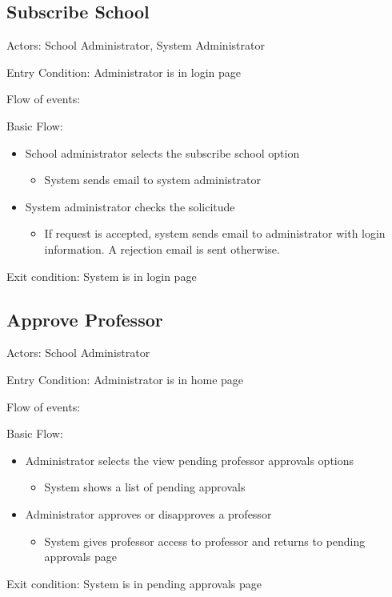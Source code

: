 
\subsection*{Subscribe School}
Actors: School Administrator, System Administrator

Entry Condition: Administrator is in login page

Flow of events:

Basic Flow:

\begin{itemize}
\item School administrator selects the subscribe school option
\begin{itemize}
\item System sends email to system administrator
\end{itemize}
\item System administrator checks the solicitude
\begin{itemize}
\item If request is accepted, system sends email to administrator with 
login information. A rejection email is sent otherwise.
\end{itemize}
\end{itemize}
Exit condition: System is in login page

\subsection*{Approve Professor}
Actors: School Administrator

Entry Condition: Administrator is in home page

Flow of events:

Basic Flow:

\begin{itemize}
\item Administrator selects the view pending professor approvals options
\begin{itemize}
\item System shows a list of pending approvals
\end{itemize}
\item Administrator approves or disapproves a professor
\begin{itemize}
\item System gives professor access to professor and returns to 
pending approvals page
\end{itemize}
\end{itemize}
Exit condition: System is in pending approvals page



